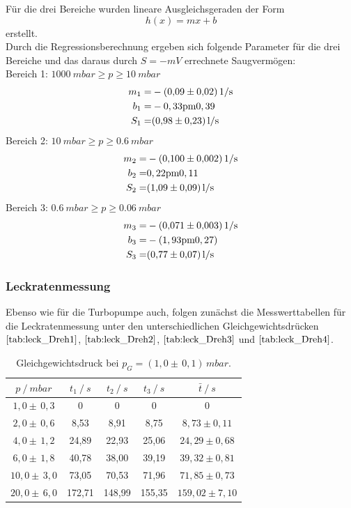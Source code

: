 Für die drei Bereiche wurden lineare Ausgleichsgeraden der Form
\begin{equation}
	h(x)=mx+b
\end{equation}
erstellt.\\
Durch die Regressionsberechnung ergeben sich folgende Parameter für die drei Bereiche und das daraus durch $S=-mV$ errechnete Saugvermögen:\\
Bereich 1: $\SI{1000}{mbar} \geq p \geq \SI{10}{mbar}$\\
\begin{align*}
	m_1=& -\SI{0,09 \pm 0,02}{1/s}\\
	b_1=& -\si{0,33 \pm 0,39}\\
	S_1=& \SI{0,98 \pm 0,23}{l/s}
\end{align*}
Bereich 2: $\SI{10}{mbar} \geq p \geq \SI{0,6}{mbar}$\\
\begin{align*}
	m_2=& -\SI{0,100 \pm 0,002}{1/s}\\
	b_2=& \si{0,22 \pm 0,11}\\
	S_2=& \SI{1,09 \pm 0,09}{l/s}
\end{align*}
Bereich 3: $\SI{0,6}{mbar} \geq p \geq \SI{0,06}{mbar}$\\
\begin{align*}
	m_3=& -\SI{0,071 \pm 0,003}{1/s}\\
	b_3=& -\si{(1,93 \pm 0,27)}\\
	S_3=& \SI{0,77 \pm 0,07}{l/s}
\end{align*}

\subsubsection{Leckratenmessung}
Ebenso wie für die Turbopumpe auch, folgen zunächst die Messwerttabellen für die Leckratenmessung
unter den unterschiedlichen Gleichgewichtsdrücken $\ref{tab:leck_Dreh1}$, $\ref{tab:leck_Dreh2}$, $\ref{tab:leck_Dreh3}$ und $\ref{tab:leck_Dreh4}$.
\begin{table}[H]
\centering
\begin{tabular}{c|c|c|c|c}
	{$p \:/\: \si{mbar}$} & {$t_1 \:/\: \si{s} $} & {$t_2 \:/\: \si{s} $} & {$t_3 \:/\: \si{s} $} & {$\bar{t} \:/\: \si{s}$}\\
\midrule
$1,0 \pm \, 0,3$ &0 &0 &0 &0\\
$2,0 \pm \, 0,6$ &   8,53 &  8,91 &  8,75 & $8,73 \pm 0,11$\\
$4,0 \pm \, 1,2$ &   24,89  &  22,93 &  25,06 & $24,29 \pm 0,68 $\\
$6,0 \pm \, 1,8$ &   40,78 &  38,00 &  39,19 & $39,32 \pm 0,81 $\\
$10,0 \pm \, 3,0$ &   73,05 &  70,53 &  71,96 & $71,85 \pm 0,73 $\\
$20,0 \pm \, 6,0$ &   172,71 &  148,99 &  155,35 & $159,02 \pm 7,10 $\\
\end{tabular}
\caption{Gleichgewichtsdruck bei $p_G=(1,0 \pm \, 0,1)  \, \si{mbar}$.}
\label{tab:leck_Dreh1}
\end{table}

